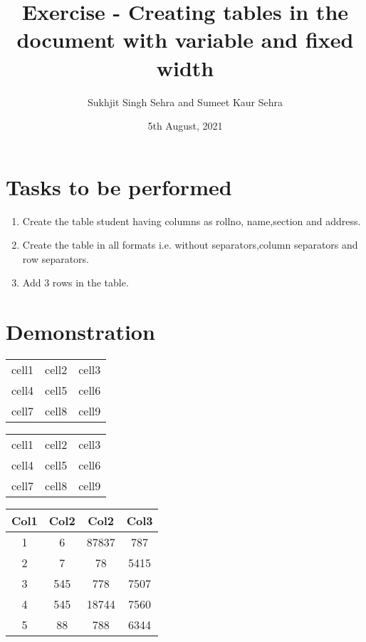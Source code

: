\documentclass{article}
\title{Exercise  - Creating tables in the document with variable and fixed width}
\author{Sukhjit Singh Sehra and Sumeet Kaur Sehra}
\date{5th August, 2021}
\begin{document}
	\maketitle	
	\section*{Tasks to be performed}
	\begin{enumerate}	
		\item Create the table student having columns as rollno, name,section and address.
		\item Create the table in all formats i.e. without separators,column separators and row separators.
		\item Add 3 rows in the table.
	\end{enumerate}
	\section*{Demonstration}
\begin{center}
\begin{tabular}{ l r c }
  cell1 & cell2 & cell3 \\ 
  cell4 & cell5 & cell6 \\  
  cell7 & cell8 & cell9    
\end{tabular}
\end{center}
\begin{center}
	\begin{tabular}{ | c | c | c | } 
		\hline
		cell1 & cell2 & cell3 \\ 
		cell4 & cell5 & cell6 \\ 
		cell7 & cell8 & cell9 \\ 
		\hline
	\end{tabular}
\end{center}

\vspace{1cm} %

\begin{center}
	\begin{tabular}{||c c c c||} 
		\hline
		Col1 & Col2 & Col2 & Col3 \\ 
		\hline\hline
		1 & 6 & 87837 & 787 \\ 
		\hline
		2 & 7 & 78 & 5415 \\
		\hline
		3 & 545 & 778 & 7507 \\
		\hline
		4 & 545 & 18744 & 7560 \\
		\hline
		5 & 88 & 788 & 6344 \\ 
		\hline
	\end{tabular}
\end{center}
\end{document}
